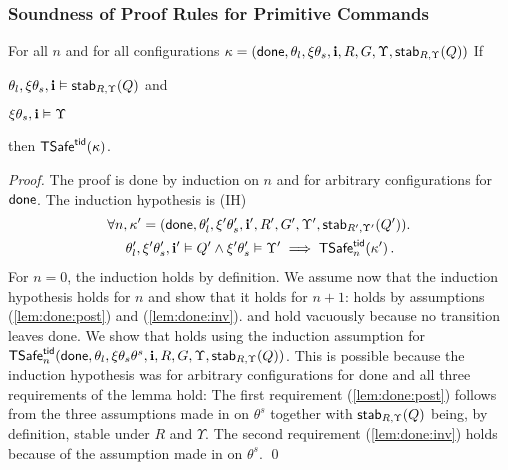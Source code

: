 
\subsubsection{Soundness of Proof Rules for Primitive Commands} %
\label{sec:sound:cprim}


 
\begin{lemma}[Done]\label{lem:done}
For all $n$ and for all configurations 
$\kappa=(\done,\theta_l,\xi\theta_s,\intp,R,G,\Upsilon,\stable{Q}{R}{\Upsilon})$
If 
\begin{compactenum}[(i)]
\item \label{lem:done:post} $\theta_l,\xi\theta_s,\intp \vDash \stable{Q}{R}{\Upsilon}$ and
\item \label{lem:done:inv} $\xi\theta_s,\intp \vDash \Upsilon$ 
\end{compactenum}
then 
$\safe(\kappa)$.
\end{lemma}

\begin{proof}
The proof is done by induction on $n$ and for arbitrary configurations for  $\done$.
The induction hypothesis is (IH)
\begin{multline*}
\forall n,\kappa'=(\done,\theta'_l,\xi'\theta'_s,\intp',R',G',\Upsilon', \stable{Q'}{R'}{\Upsilon'}).\, \\
\theta_l',\xi'\theta'_s,\intp' \vDash Q' \land \xi'\theta'_s \vDash \Upsilon'   \implies
\safe_n(\kappa')\,.
\end{multline*}
For $n=0$, the induction holds by definition.
We assume now that the induction hypothesis holds for $n$ and show that it holds for $n+1$:
 holds by assumptions  (\ref{lem:done:post}) and  (\ref{lem:done:inv}).
 and  hold vacuously because no transition leaves \textsf{done}.
We show that  holds using the induction assumption for 
$\safe_n(\textsf{done},\theta_l,\xi\theta_s\theta^s,\intp,R,G,\Upsilon,\stable{Q}{R}{\Upsilon})$.
This is possible because the induction hypothesis was for arbitrary configurations for  \textsf{done} and 
all three requirements of the lemma hold:
The first requirement (\ref{lem:done:post}) follows from the 
three assumptions made in  on $\theta^s$ 
together with $\stable{Q}{R}{\Upsilon}$ being, by definition, %
stable under  $R$ and $\Upsilon$. 
The second requirement (\ref{lem:done:inv})  holds because of 
the assumption made in  on $\theta^s$. 
\qed\end{proof}




